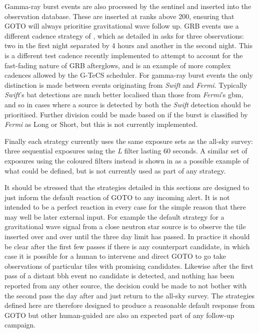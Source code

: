 \begin{colsection}
\begin{colsection}
Gamma-ray burst events are also processed by the sentinel and inserted into the observation database. These are inserted at ranks above 200, ensuring that GOTO will always prioritise gravitational wave follow up. GRB events use a different cadence strategy of , which as detailed in  asks for three observations: two in the first night separated by 4 hours and another in the second night. This is a different test cadence recently implemented to attempt to account for the fast-fading nature of GRB afterglows, and is an example of more complex cadences allowed by the G-TeCS scheduler. For gamma-ray burst events the only distinction is made between events originating from \textit{Swift} and \textit{Fermi}. Typically \textit{Swift}'s \gls{bat} detections are much better localised than those from \textit{Fermi}'s \gls{gbm}, and so in cases where a source is detected by both the \textit{Swift} detection should be prioritised. Further division could be made based on if the burst is classified by \textit{Fermi} as Long or Short, but this is not currently implemented.

Finally each strategy currently uses the same exposure sets as the all-sky survey: three sequential exposures using the \textit{L} filter lasting 60 seconds. A similar set of exposures using the coloured filters instead is shown in  as a possible example of what could be defined, but is not currently used as part of any strategy.

It should be stressed that the strategies detailed in this sections are designed to just inform the default reaction of GOTO to any incoming alert. It is not intended to be a perfect reaction in every case for the simple reason that there may well be later external input. For example the default strategy for a gravitational wave signal from a close neutron star source is to observe the tile inserted over and over until the three day limit has passed. In practice it should be clear after the first few passes if there is any counterpart candidate, in which case it is possible for a human to intervene and direct GOTO to go take observations of particular tiles with promising candidates. Likewise after the first pass of a distant \gls{bbh} event no candidate is detected, and nothing has been reported from any other source, the decision could be made to not bother with the second pass the day after and just return to the all-sky survey. The strategies defined here are therefore designed to produce a reasonable default response from GOTO but other human-guided are also an expected part of any follow-up campaign.


\end{colsection}
\end{colsection}
